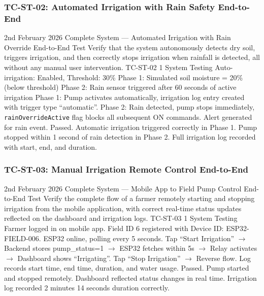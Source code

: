 \subsubsection{TC-ST-02: Automated Irrigation with Rain Safety End-to-End}

\testcase%
{2nd February 2026}%
{Complete System --- Automated Irrigation with Rain
Override End-to-End Test}%
{Verify that the system autonomously detects dry soil,
triggers irrigation, and then correctly stops irrigation
when rainfall is detected, all without any manual user
intervention.}%
{TC-ST-02}%
{1}%
{System Testing}%
{Auto-irrigation: Enabled, Threshold: 30\% \newline
Phase 1: Simulated soil moisture = 20\% (below threshold)
\newline
Phase 2: Rain sensor triggered after 60 seconds of active
irrigation}%
{Phase 1: Pump activates automatically, irrigation log
entry created with trigger type ``automatic''. \newline
Phase 2: Rain detected, pump stops immediately,
\texttt{rainOverrideActive} flag blocks all subsequent
ON commands. Alert generated for rain event.}%
{Passed. Automatic irrigation triggered correctly in Phase
1. Pump stopped within 1 second of rain detection in Phase
2. Full irrigation log recorded with start, end, and
duration.}

\subsubsection{TC-ST-03: Manual Irrigation Remote Control End-to-End}

\testcase%
{2nd February 2026}%
{Complete System --- Mobile App to Field Pump Control
End-to-End Test}%
{Verify the complete flow of a farmer remotely starting
and stopping irrigation from the mobile application, with
correct real-time status updates reflected on the
dashboard and irrigation logs.}%
{TC-ST-03}%
{1}%
{System Testing}%
{Farmer logged in on mobile app. Field ID 6 registered
with Device ID: ESP32-FIELD-006. \newline
ESP32 online, polling every 5 seconds.}%
{Tap ``Start Irrigation'' $\rightarrow$ Backend stores
pump\_status=1 $\rightarrow$ ESP32 fetches within 5s
$\rightarrow$ Relay activates $\rightarrow$ Dashboard shows
``Irrigating''. \newline
Tap ``Stop Irrigation'' $\rightarrow$ Reverse flow. Log
records start time, end time, duration, and water usage.}%
{Passed. Pump started and stopped remotely. Dashboard
reflected status changes in real time. Irrigation log
recorded 2 minutes 14 seconds duration correctly.}

